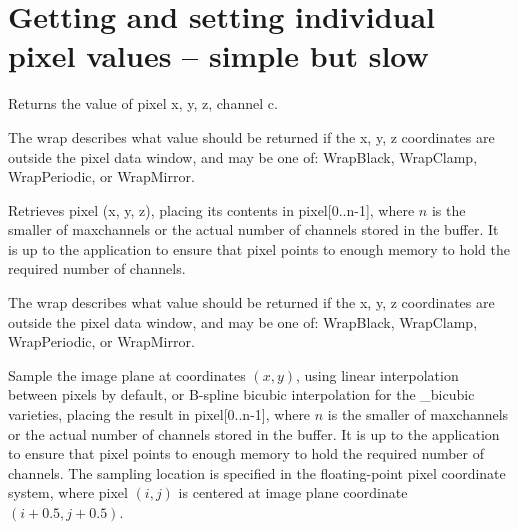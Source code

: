 \section{Getting and setting individual pixel values -- simple but slow}

Returns the value of pixel {\cf x, y, z}, channel {\cf c}.  

The {\cf wrap} describes what value should be returned if the {\cf x, y, z}
coordinates are outside the pixel data window, and may be one of:
{\cf WrapBlack}, {\cf WrapClamp}, {\cf WrapPeriodic}, or {\cf WrapMirror}.
\apiend


Retrieves pixel ({\cf x, y, z}), placing its contents in
{\cf pixel[0..n-1]}, where $n$ is the smaller of {\cf maxchannels}
or the actual number of channels stored in the buffer.  It is up to
the application to ensure that {\cf pixel} points to enough memory
to hold the required number of channels.

The {\cf wrap} describes what value should be returned if the {\cf x, y, z}
coordinates are outside the pixel data window, and may be one of:
{\cf WrapBlack}, {\cf WrapClamp}, {\cf WrapPeriodic}, or {\cf WrapMirror}.
\apiend

Sample the image plane at coordinates $(x,y)$,
using linear interpolation between pixels by default, or B-spline
bicubic interpolation for the {\cf _bicubic} varieties, placing the result in
{\cf pixel[0..n-1]}, where $n$ is the smaller of {\cf maxchannels}
or the actual number of channels stored in the buffer.  It is up to
the application to ensure that {\cf pixel} points to enough memory
to hold the required number of channels.
The sampling location is specified in the floating-point pixel coordinate
system, where pixel $(i,j)$ is centered at image plane coordinate $(i+0.5,
j+0.5)$.

